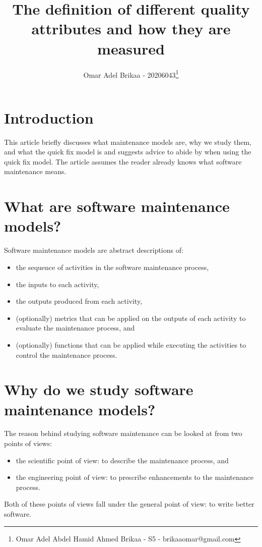 \documentclass[11pt,a4paper]{article}
\begin{document}
\title{The definition of different quality attributes and how they are measured}
\author{Omar Adel Brikaa - 20206043\thanks{Omar Adel Abdel Hamid Ahmed Brikaa - S5 - brikaaomar@gmail.com}}
\date{}
\maketitle

\tableofcontents

\section{Introduction}
This article briefly discusses what maintenance models are, why we study them,
and what the quick fix model is and suggests advice to abide by when using the quick fix model.
The article assumes the reader already knows what software maintenance means.

\section{What are software maintenance models?}
Software maintenance models are abstract descriptions of:
\begin{itemize}
    \item the sequence of activities in the software maintenance process,
    \item the inputs to each activity,
    \item the outputs produced from each activity,
    \item (optionally) metrics that can be applied on the outputs of each activity to evaluate the maintenance process,
        and
    \item (optionally) functions that can be applied while executing the activities to control the maintenance process.
\end{itemize}

\section{Why do we study software maintenance models?}
The reason behind studying software maintenance can be looked at from two points of views:
\begin{itemize}
    \item the scientific point of view: to describe the maintenance process, and
    \item the engineering point of view: to prescribe enhancements to the maintenance process.
\end{itemize}
Both of these points of views fall under the general point of view: to write better software.
\end{document}
